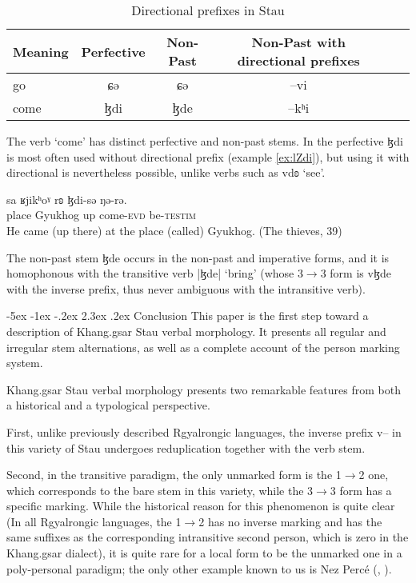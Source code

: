 \documentclass[oldfontcommands,twoside,usletter,12pt]{memoir}
\makeatletter
\newcommand{\ipa}[1]{{\phon #1}} %
\renewcommand\section{\@startsection{section}{0}{\z@}%
                                   {-5ex \@plus -1ex \@minus -.2ex}%
                                   {2.3ex \@plus.2ex}%
                                   {\flushleft\large\bfseries}}
\makeatother
\begin{document}
\begin{table}[H]
\centering
\begin{tabular}{lccccc}
\toprule
Meaning & Perfective & Non-Past & Non-Past with directional prefixes \\
\midrule
go & \ipa{ɕə} &\ipa{ɕə} & \ipa{--vi} \\
come & \ipa{ɮdi} &\ipa{ɮde} & \ipa{--kʰi} \\
\bottomrule
\end{tabular}
\caption{Directional prefixes in Stau} \label{tab:motion.irr} 
\end{table}

The verb `come' has distinct perfective and non-past stems. In the perfective \ipa{ɮdi} is most often used   without directional prefix (example \ref{ex:lZdi}), but using it with directional is nevertheless possible, unlike verbs such as \ipa{vdʚ} `see'.

\begin{exe}
\ex \label{ex:lZdi}
\gll 
\ipa{sa}  	\ipa{ʁjikʰoˠ}  	\ipa{rʚ}  	\ipa{ɮdi-sə}  	\ipa{ŋə-rə.}   \\
place Gyukhog up come-\textsc{evd} be-\textsc{testim} \\
\glt He came (up there) at the place (called) Gyukhog. (The thieves, 39)
\end{exe}

The non-past stem \ipa{ɮde} occurs in the non-past and imperative forms, and it is homophonous with the transitive verb |\ipa{ɮde}| `bring' (whose 3$\rightarrow$3 form is \ipa{vɮde} with the inverse prefix, thus never ambiguous with the intransitive verb).

 
\section{Conclusion}
This paper is the first step toward a description of Khang.gsar Stau verbal morphology. It presents all regular and irregular stem alternations, as well as a complete account of the person marking system.

Khang.gsar Stau verbal morphology presents two remarkable features  from both a historical and a typological perspective.

First, unlike previously described Rgyalrongic languages, the inverse prefix \ipa{v}-- in this variety of Stau undergoes reduplication together with the verb stem. 

Second, in the transitive paradigm, the only unmarked form is the 1$\rightarrow$2 one, which corresponds to the bare stem in this variety, while the 3$\rightarrow$3 form has a specific marking. While the historical reason for this phenomenon is quite clear (In all Rgyalrongic languages, the 1$\rightarrow$2 has no inverse marking and has the same suffixes as the corresponding intransitive second person, which is zero in the Khang.gsar dialect), it is quite rare for a local form to be the unmarked one in a poly-personal paradigm; the only other example known to us is Nez Percé (\citealt{Rude1997}, \citealt[166-167]{zuniga06}).
\end{document}
